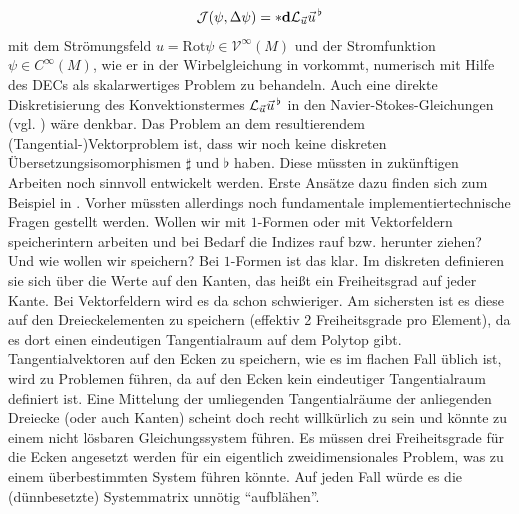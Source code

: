 \begin{fazit}
    \begin{align}
      \mathcal{J}(\psi,\Delta\psi) = *\mathbf{d}\mathcal{L}_{\vec{u}}\vec{u}^{\,\flat} 
    \end{align}
    mit dem Strömungsfeld \( u = \text{Rot}\psi\in\mathcal{V}^{\infty}(M) \) und der Stromfunktion \( \psi\in C^{\infty}(M) \),
    wie er in der Wirbelgleichung in \cite{nitschke} vorkommt, numerisch mit Hilfe des DECs als skalarwertiges Problem 
    zu behandeln.
    Auch eine direkte Diskretisierung des Konvektionstermes \( \mathcal{L}_{\vec{u}}\vec{u}^{\,\flat} \) in den
    Navier-Stokes-Gleichungen (vgl. \cite[Kap.8]{Marsden}) wäre denkbar.
    Das Problem an dem resultierendem (Tangential-)Vektorproblem ist, dass wir noch keine diskreten
    Übersetzungsisomorphismen \( \sharp \) und \( \flat \) haben.
    Diese müssten in zukünftigen Arbeiten noch sinnvoll entwickelt werden.
    Erste Ansätze dazu finden sich zum Beispiel in \cite{hirani}.
    Vorher müssten allerdings noch fundamentale implementiertechnische Fragen gestellt werden.
    Wollen wir mit \( 1 \)-Formen oder mit Vektorfeldern speicherintern arbeiten und bei Bedarf die Indizes rauf bzw. herunter ziehen?
    Und wie wollen wir speichern?
    Bei \( 1 \)-Formen ist das klar. 
    Im diskreten definieren sie sich über die Werte auf den Kanten, das heißt ein Freiheitsgrad auf jeder Kante.
    Bei Vektorfeldern wird es da schon schwieriger. Am sichersten ist es diese auf den Dreieckelementen zu speichern (effektiv 2 Freiheitsgrade pro Element), da es dort einen eindeutigen
    Tangentialraum auf dem Polytop gibt. 
    Tangentialvektoren auf den Ecken zu speichern, wie es im flachen Fall üblich ist, wird zu Problemen führen, da auf den Ecken kein eindeutiger Tangentialraum definiert ist.
    Eine Mittelung der umliegenden Tangentialräume der anliegenden Dreiecke (oder auch Kanten) scheint doch
    recht willkürlich zu sein und könnte zu einem nicht lösbaren Gleichungssystem
    führen. Es müssen drei Freiheitsgrade für die Ecken angesetzt werden für ein eigentlich zweidimensionales Problem, was zu einem überbestimmten System führen könnte.
    Auf jeden Fall würde es die (dünnbesetzte) Systemmatrix unnötig "`aufblähen"'.


\end{fazit}
